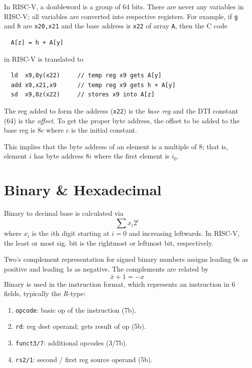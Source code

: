 \documentclass{tufte-book}
\begin{document}

\bigskip
In RISC-V, a doubleword is a group of 64 bits. There are never any variables in RISC-V; all variables are converted into respective registers. For example, if \verb|g| and \verb|h| are \verb|x20,x21| and the base address is \verb|x22| of array \verb|A|, then the C code


\begin{lstlisting}
  A[z] = h + A[y]
\end{lstlisting}
in RISC-V is translated to
\begin{lstlisting}
  ld  x9,8y(x22)     // temp reg x9 gets A[y]
  add x9,x21,x9      // temp reg x9 gets h + A[y]
  sd  x9,8z(x22)     // stores x9 into A[z]
\end{lstlisting}
The reg added to form the address (\verb|x22|) is the \textit{base reg} and the DTI constant (64) is the \textit{offset}. To get the proper byte address, the offset to be added to the base reg is $8c$ where $c$ is the initial constant.


\bigskip
This implies that the byte address of an element is a multiple of 8; that is, element $i$ has byte address $8i$ where the first element is $i_0$.

\section{Binary \& Hexadecimal}
Binary to decimal base is calculated via \begin{equation}
  \sum x_i 2^i
\end{equation}
where $x_i$ is the $i$th digit starting at $i=0$ and increasing leftwards. In RISC-V, the least or most sig. bit is the rightmost or leftmost bit, respectively.

\bigskip
Two's complement representation for signed binary numbers assigns leading 0s as positive and leading 1s as negative. The complements are related by \begin{equation}
  \overline{x} + 1 = -x
\end{equation}
Binary is used in the instruction format, which represents an instruction in 6 fields, typically the \textit{R}-type:
\begin{enumerate}
  \item \verb|opcode|: basic op of the instruction (7b).
  \item \verb|rd|: reg dest operand; gets result of op (5b).
  \item \verb|funct3/7|: additional opcodes (3/7b).
  \item \verb|rs2/1|: second / first reg source operand (5b).
\end{enumerate}
\end{document}
